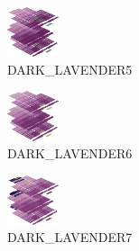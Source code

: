 \hspace{0.1cm}
\begin{minipage}[b]{0.15\linewidth}
\begin{figure}[H]                                                          
  \centering                                                             
  \begin{adjustbox}{width=1.5cm,center}                                   
  \includegraphics[width=1.5cm]{src/colorspace_colourflow/flows/colourflow_85-45.png}%
  \end{adjustbox}                                                        
\caption*{DARK\_LAVENDER5}                                           
\end{figure}                                                               
\end{minipage}
\hspace{0.1cm}
\begin{minipage}[b]{0.15\linewidth}
\begin{figure}[H]                                                          
  \centering                                                             
  \begin{adjustbox}{width=1.5cm,center}                                   
  \includegraphics[width=1.5cm]{src/colorspace_colourflow/flows/colourflow_86-45.png}%
  \end{adjustbox}                                                        
\caption*{DARK\_LAVENDER6}                                           
\end{figure}                                                               
\end{minipage}
\hspace{0.1cm}
\begin{minipage}[b]{0.15\linewidth}
\begin{figure}[H]                                                          
  \centering                                                             
  \begin{adjustbox}{width=1.5cm,center}                                   
  \includegraphics[width=1.5cm]{src/colorspace_colourflow/flows/colourflow_87-45.png}%
  \end{adjustbox}                                                        
\caption*{DARK\_LAVENDER7}                                           
\end{figure}                                                               
\end{minipage}
